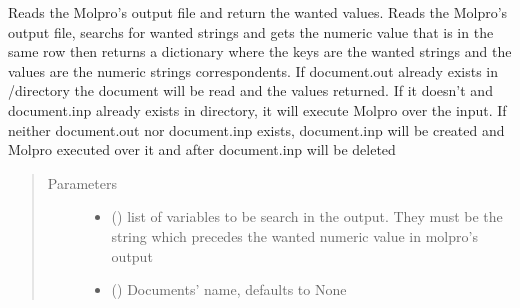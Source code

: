 \documentclass[letterpaper,10pt,english]{sphinxmanual}
\begin{document}
\begin{fulllineitems}
\begin{fulllineitems}
\label{\detokenize{molecular:molecular.Molecule.get_value}}
\sphinxAtStartPar
Reads the Molpro’s output file and return the wanted values.
Reads the Molpro’s output file, searchs for wanted strings and gets the numeric value that is in the same row
then returns a dictionary where the keys are the wanted strings and the values are the numeric strings
correspondents. If document.out already exists in /directory the document will be read and the values returned.
If it doesn’t and document.inp already exists in directory, it will execute Molpro over the input. If neither
document.out nor document.inp exists, document.inp will be created and Molpro executed over it and after
document.inp will be deleted
\begin{quote}\begin{description}
\item[{Parameters}] \leavevmode\begin{itemize}
\item {} 
\sphinxAtStartPar
{} (\sphinxstyleliteralemphasis{\sphinxupquote{{[}}}\sphinxstyleliteralemphasis{\sphinxupquote{{]}}}) \textendash{} list of variables to be search in the output. They must be the string which precedes the wanted
numeric value in molpro’s output

\item {} 
\sphinxAtStartPar
{} (\sphinxstyleliteralemphasis{\sphinxupquote{, }}) \textendash{} Documents’ name, defaults to None


\end{itemize}
\end{description}
\end{quote}
\end{fulllineitems}
\end{fulllineitems}
\end{document}
